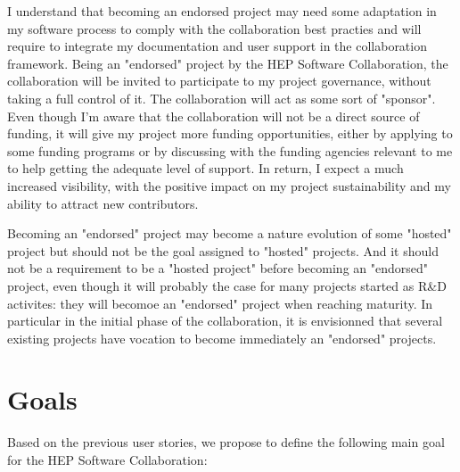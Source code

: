 \documentclass[11pt]{article} %
\begin{document}
I understand that becoming an endorsed project may need some adaptation in my software process to comply with the collaboration best practies and will require
to integrate my documentation and user support in the collaboration framework. Being an "endorsed" project by the HEP Software Collaboration, the collaboration
will be invited to participate to my project governance, without taking a full control of it. The collaboration will act as some sort of "sponsor". Even though I'm aware
that the collaboration will not be a direct source of funding, it will give my project more funding opportunities, either by applying to some funding programs or 
by discussing with the funding
agencies relevant to me to help getting the adequate level of support. In return, I expect a much increased visibility, with the positive impact
on my project sustainability and my ability to attract new contributors.

Becoming an "endorsed" project may become a nature evolution of some "hosted" project but should not be the goal assigned to "hosted" projects. And
it should not be a requirement to be a "hosted project" before becoming an "endorsed" project, even though it will probably the case for many projects
started as R\&D activites: they will becomoe an "endorsed" project when reaching maturity. In particular in the initial phase of the collaboration,
it is envisionned that several existing projects have vocation to become immediately an "endorsed" projects.

\section{Goals}

Based on the previous user stories, we propose to define the following main goal for the HEP Software
Collaboration:
\end{document}
